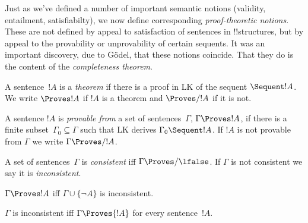 \documentclass[../../include/open-logic-section]{subfiles}
\begin{document}

\begin{explain}
Just as we've defined a number of important semantic notions
(validity, entailment, satisfiabilty), we now define corresponding
\emph{proof-theoretic notions}. These are not defined by appeal to
satisfaction of sentences in !!{structure}s, but by appeal to the
provability or unprovability of certain sequents.  It was an important
discovery, due to G\"odel, that these notions coincide.  That they do
is the content of the \emph{completeness theorem}.
\end{explain}

\begin{defn}[Theorems]
A sentence~$!A$ is a \emph{theorem} if there is a proof in LK of the
sequent $\Sequent !A$. We write $\Proves !A$ if $!A$ is a theorem and
$\Proves/ !A$ if it is not.
\end{defn}

\begin{defn}[Provability]
A sentence $!A$ is \emph{provable from} a set of sentences~$\Gamma$,
$\Gamma \Proves !A$, if there is a finite subset~$\Gamma_0 \subseteq
\Gamma$ such that LK derives $\Gamma_0 \Sequent !A$.  If $!A$ is not
provable from $\Gamma$ we write $\Gamma \Proves/ !A$.
\end{defn}

\begin{defn}[Consistency]
A set of sentences~$\Gamma$ is \emph{consistent} iff $\Gamma \Proves/
\lfalse$.  If $\Gamma$ is not consistent we say it is \emph{inconsistent}.
\end{defn}

\begin{prop}
$\Gamma \Proves !A$ iff $\Gamma \cup \{\lnot A\}$ is inconsistent.
\end{prop}

\begin{prop}
$\Gamma$ is inconsistent iff $\Gamma \Proves {!A}$ for every sentence~$!A$.
\end{prop}
\end{document}

